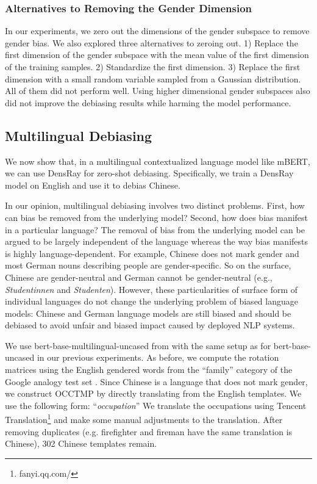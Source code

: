 \subsubsection*{Alternatives to Removing the Gender Dimension}
In our experiments, we zero out the dimensions of the gender
subspace to remove gender bias. 
We also explored three alternatives to zeroing out. 1)
Replace the first dimension of the gender subspace with the
mean value of the first dimension of the training
samples. 2) Standardize the first dimension. 3) Replace the
first dimension with a small random variable sampled from a Gaussian distribution. All of them did not perform well. Using higher dimensional gender subspaces also did not improve the debiasing results while harming the model performance.


\subsection{Multilingual Debiasing}
We now show that, in a multilingual contextualized language model like mBERT, we can use DensRay for zero-shot debiasing. Specifically, we train a DensRay model on English and use it to debias Chinese.

In our opinion, multilingual debiasing involves two distinct
	problems. First, how can bias be removed from the underlying
	model? Second, how does bias manifest in a particular
	language? The removal of bias from the underlying model can
	be argued to be largely independent of the language whereas
	the way bias manifests is highly language-dependent. For
	example, Chinese does not mark gender and most German nouns
	describing people are gender-specific. So on the surface,
	Chinese are gender-neutral and German
	cannot be gender-neutral (e.g., \textit{Studentinnen} and \textit{Studenten}). However, these particularities of surface form of individual
	languages do not change the underlying problem of biased
	language models: Chinese and German language models are
	still biased and should be debiased to avoid unfair and
	biased impact caused by deployed NLP systems.
	
We use  bert-base-multilingual-uncased from
\cite{wolf2019huggingfaces} with the same setup as for
bert-base-uncased in our previous experiments. As before, we
compute the rotation matrices using the English gendered
words from the ``family'' category of the Google analogy
test set \cite{mikolov2013efficient}. Since Chinese is a language that does not mark gender, we construct OCCTMP by directly translating from the English templates. We use the following form:
``\text{[MASK]}\textit{occupation}'' We translate the occupations using Tencent Translation\footnote{fanyi.qq.com/} and make some manual adjustments to the translation. After removing duplicates (e.g. firefighter and fireman have the same translation is Chinese), 302 Chinese templates remain.


